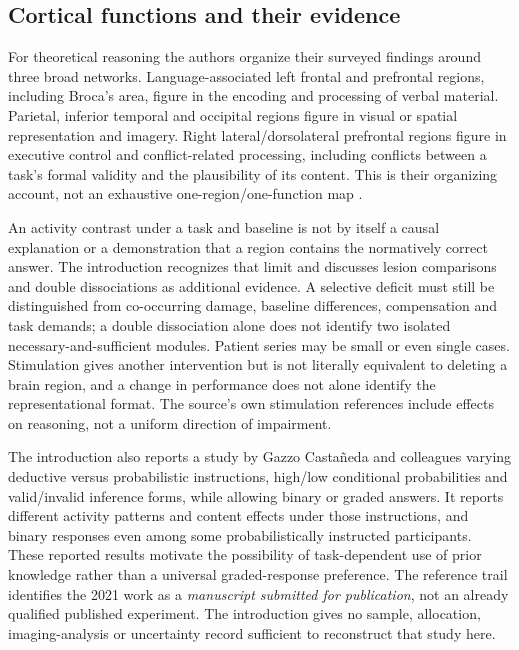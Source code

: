 \subsection{Cortical functions and their evidence}

For theoretical reasoning the authors organize their surveyed findings
around three broad networks. Language-associated left frontal and
prefrontal regions, including Broca's area, figure in the encoding and
processing of verbal material. Parietal, inferior temporal and occipital
regions figure in visual or spatial representation and imagery. Right
lateral/dorsolateral prefrontal regions figure in executive control and
conflict-related processing, including conflicts between a task's
formal validity and the plausibility of its content. This is their
organizing account, not an exhaustive one-region/one-function map
\cite[pp.~35--37]{KnauffSpohn2021FrameworksIntro}.

An activity contrast under a task and baseline is not by itself a
causal explanation or a demonstration that a region contains the
normatively correct answer. The introduction recognizes that limit
and discusses lesion comparisons and double dissociations as additional
evidence. A selective deficit must still be distinguished from
co-occurring damage, baseline differences, compensation and task
demands; a double dissociation alone does not identify two isolated
necessary-and-sufficient modules. Patient series may be small or even
single cases. Stimulation gives another intervention but is not
literally equivalent to deleting a brain region, and a change in
performance does not alone identify the representational format.
The source's own stimulation references include effects on reasoning,
not a uniform direction of impairment.

The introduction also reports a study by Gazzo Castañeda and colleagues
varying deductive versus probabilistic instructions, high/low conditional
probabilities and valid/invalid inference forms, while allowing binary
or graded answers. It reports different activity patterns and
content effects under those instructions, and binary responses even
among some probabilistically instructed participants. These reported
results motivate the possibility of task-dependent use of prior
knowledge rather than a universal graded-response preference. The
reference trail identifies the 2021 work as a \emph{manuscript submitted
for publication}, not an already qualified published experiment.
The introduction gives no sample, allocation, imaging-analysis or
uncertainty record sufficient to reconstruct that study here.


